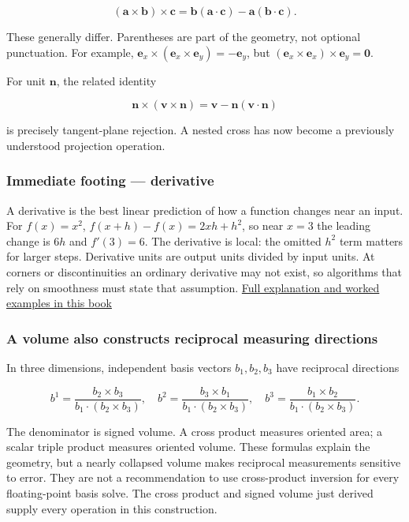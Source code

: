 \[
(\mathbf a\times\mathbf b)\times\mathbf c
=\mathbf b(\mathbf a\cdot\mathbf c)-\mathbf a(\mathbf b\cdot\mathbf c).
\]

These generally differ. Parentheses are part of the geometry, not optional punctuation. For example, \(\mathbf e_x\times(\mathbf e_x\times\mathbf e_y)=-\mathbf e_y\), but \((\mathbf e_x\times\mathbf e_x)\times\mathbf e_y=\mathbf0\).

For unit \(\mathbf n\), the related identity

\[
\mathbf n\times(\mathbf v\times\mathbf n)
=\mathbf v-\mathbf n(\mathbf v\cdot\mathbf n)
\]

is precisely tangent-plane rejection. A nested cross has now become a previously understood projection operation.

\subsubsection{Immediate footing --- derivative}\label{01-foundations-i-ch017-immediate-footing-derivative}

A derivative is the best linear prediction of how a function changes near an input. For \(f(x)=x^2\), \(f(x+h)-f(x)=2xh+h^2\), so near \(x=3\) the leading change is \(6h\) and \(f'(3)=6\). The derivative is local: the omitted \(h^2\) term matters for larger steps. Derivative units are output units divided by input units. At corners or discontinuities an ordinary derivative may not exist, so algorithms that rely on smoothness must state that assumption. \hyperref[01-foundations-i-ch020-functions-limits-continuity-and-scalar-change]{Full explanation and worked examples in this book}

\subsubsection{A volume also constructs reciprocal measuring directions}\label{01-foundations-i-ch017-a-volume-also-constructs-reciprocal-measuring-directions}

In three dimensions, independent basis vectors \(b_1,b_2,b_3\) have reciprocal directions

\[
b^1=\frac{b_2\times b_3}{b_1\cdot(b_2\times b_3)},\quad
b^2=\frac{b_3\times b_1}{b_1\cdot(b_2\times b_3)},\quad
b^3=\frac{b_1\times b_2}{b_1\cdot(b_2\times b_3)}.
\]

The denominator is signed volume. A cross product measures oriented area; a scalar triple product measures oriented volume. These formulas explain the geometry, but a nearly collapsed volume makes reciprocal measurements sensitive to error. They are not a recommendation to use cross-product inversion for every floating-point basis solve. The cross product and signed volume just derived supply every operation in this construction.

